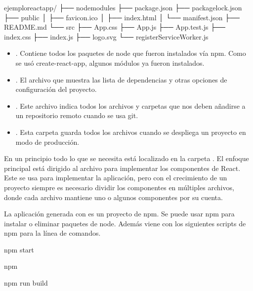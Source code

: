%
\begin{sphinxVerbatim}[commandchars=\\\{\}]
ejemplo\PYGZus{}react\PYGZus{}app/
├── node\PYGZus{}modules
├── package.json
├── package\PYGZhy{}lock.json
├── public
│   ├── favicon.ico
│   ├── index.html
│   └── manifest.json
├── README.md
└── src
    ├── App.css
    ├── App.js
    ├── App.test.js
    ├── index.css
    ├── index.js
    ├── logo.svg
    └── registerServiceWorker.js
\end{sphinxVerbatim}

\begin{itemize}
\item {} 
. Contiene todos los paquetes de node que fueron instalados vía npm. Como se usó create-react-app, algunos módulos ya fueron instalados.

\item {} 
. El archivo que muestra las lista de dependencias y otras opciones de configuración del proyecto.

\item {} 
. Este archivo indica todos los archivos y carpetas que nos deben añadirse a un repositorio remoto cuando se usa git.

\item {} 
. Esta carpeta guarda todos los archivos cuando se despliega un proyecto en modo de producción.

\end{itemize}

En un principio todo lo que se necesita está localizado en la carpeta .
El enfoque principal está dirigido al archivo  para implementar los
componentes de React. Este se usa para implementar la aplicación, pero con el
crecimiento de un proyecto siempre es necesario dividir los componentes en
múltiples archivos, donde cada archivo mantiene uno o algunos componentes por
su cuenta.

La aplicación generada con  es un proyecto de npm. Se puede usar
npm para instalar o eliminar paquetes de node. Además viene con los siguientes
scripts de npm para la línea de comandos.

%
\begin{sphinxVerbatim}[commandchars=\\\{\}]
npm start

npm 

npm run build
\end{sphinxVerbatim}

